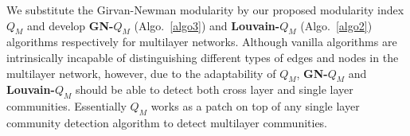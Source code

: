 We substitute the Girvan-Newman modularity by our proposed modularity index $Q_M$ and develop \textbf{GN-$Q_M$} (Algo.~\ref{algo3})
and \textbf{Louvain-$Q_M$} (Algo.~\ref{algo2}) algorithms respectively for multilayer networks.
Although vanilla algorithms are intrinsically incapable of distinguishing different types of edges and nodes in the multilayer 
network, however, due to
the adaptability of $Q_M$, \textbf{GN-$Q_M$} and \textbf{Louvain-$Q_M$} should be able to detect both cross layer
and single layer communities. Essentially $Q_M$ works as a patch on top of any single layer
community detection algorithm to detect multilayer communities.




%

